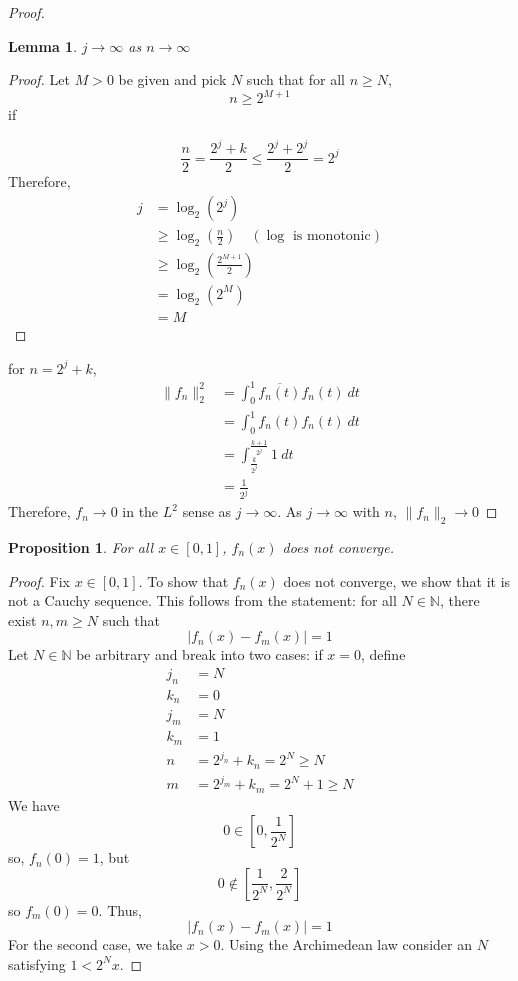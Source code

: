 \documentclass[12pt, reqno]{amsart}
\newtheorem{prop}{Proposition}[section]
\newtheorem{lemma}[theorem]{Lemma}
\theoremstyle{definition}
\theoremstyle{remark}
\begin{document}
\begin{itemize}
\begin{proof}
\begin{lemma}
    $j\to\infty$ as $n\to\infty$
\end{lemma}

\begin{proof}
    Let $M>0$ be given and pick $N$ such that for all $n\ge N$, $$
n\ge 2^{M+1}
$$if 

$$\frac{n}{2}=\frac{2^{j}+k}{2}\le \frac{2^{j}+2^{j}}{2}= 2^{j}$$Therefore, \begin{align*}
j&= \log_{2}(2^{j})\\
&\ge \log_{2}\left(\frac{n}{2}\right)\quad(\log\text{ is monotonic})\\
&\ge \log_{2}\left(\frac{2^{M+1}}{2}\right)\\
&= \log_{2}(2^{M})\\
&= M
\end{align*}
\end{proof}

for $n=2^{j}+k$,  \begin{align*}
    \|f_{n}\|^{2}_{2}&= \int_{0}^{1}\overline{f_{n}(t)}f_{n}(t)\ dt\\
    &= \int_{0}^{1}f_{n}(t)f_{n}(t)\ dt\\
    &= \int_{\frac{k}{2^{j}}}^{\frac{k+1}{2^{j}}}1\ dt\\
    &= \frac{1}{2^{j}}
    \end{align*}Therefore, $f_{n}\rightarrow 0$ in the $L^{2}$ sense as $j \rightarrow \infty$. As $j \rightarrow \infty$ with $n$, $\|f_{n}\|_{2}\rightarrow 0$
    
\end{proof}

\begin{prop}
    For all $x\in[0,1]$, $f_n(x)$ does not converge.
\end{prop}

\begin{proof}
    Fix $x\in[0,1]$. To show that $f_{n}(x)$ does not converge, we show that it is not a Cauchy sequence. This follows from the statement: for all $N\in \mathbb{N}$, there exist $n,m\ge N$ such that $$|f_{n}(x)-f_{m}(x)|=1$$
Let $N\in \mathbb{N}$ be arbitrary and break into two cases: if $x=0$, define \begin{align*}
j_{n}&= N\\
k_{n}&= 0\\
j_{m}&= N\\
k_{m}&= 1\\
n&= 2^{j_n}+k_n=2^N\ge N\\
m&= 2^{j_m}+k_m=2^N+1\ge N
\end{align*}We have $$0\in\left[0, \frac{1}{2^{N}}\right]$$so, $f_{n}(0)=1$, but $$0\notin\left[ \frac{1}{2^{N}},\frac{2}{2^{N}}\right]$$so $f_{m}(0)=0$. Thus, $$|f_{n}(x)-f_{m}(x)|=1$$
For the second case, we take $x>0$. Using the Archimedean law consider an $N$ satisfying $1<2^{N}x$. 


\end{proof}
\end{itemize}
\end{document}
